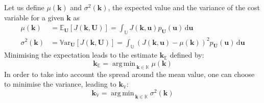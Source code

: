 \documentclass[preprint, 1p]{elsarticle}
\DeclareMathOperator*{\argmin}{arg\,min \,}
\newcommand{\Var}{\mathbb{V}\textrm{ar}}
\newcommand{\Ex}{\mathbb{E}}
\newcommand{\Prob}{\mathbb{P}}
\newcommand{\kmean}{{\mathbf{k}}_{\Ex}}
\newcommand{\kvar}{{\mathbf{k}}_{\mathbb{V}}}
\newcommand{\Kspace}{\mathbb{K}}
\newcommand{\Uspace}{\mathbb{U}}
\begin{document}
Let us define $\mu(\mathbf{k})$ and $\sigma^2(\mathbf{k})$, the expected value and the variance of the cost variable  for a given $\mathbf{k}$ as 
\begin{align}
  \label{eq:def_mu}
  \mu(\mathbf{k}) &= \Ex_{\mathbf{U}}\left[J(\mathbf{k},\mathbf{U})\right] = %
   \int_{\Uspace} J(\mathbf{k},\mathbf{u})p_{\mathbf{U}}(\mathbf{u}) \, \mathrm{d}\mathbf{u} \\
  \label{eq:def_sigma2}
  \sigma^2(\mathbf{k}) &= \Var_{\mathbf{U}}\left[J(\mathbf{k},\mathbf{U})\right] 
   =\int_{\Uspace} \left(J(\mathbf{k},\mathbf{u}) - \mu(\mathbf{k})\right)^2 p_{\mathbf{U}}(\mathbf{u})\, \mathrm{d}\mathbf{u}
\end{align} 
%
Minimising the expectation leads to the estimate $\kmean$ defined by:
\begin{equation}
  \label{eq:stoch_opt_def_mean}
  \kmean = \argmin_{\mathbf{k}\in\Kspace} \mu(\mathbf{k})
\end{equation}
In order to take into account the spread around the mean value, one can choose to minimise the variance, leading to $\kvar$:
\begin{equation}
  \label{eq:stoch_opt_def_var}
  \kvar = \argmin_{\mathbf{k} \in \Kspace} \sigma^2(\mathbf{k})
\end{equation}
\end{document}
